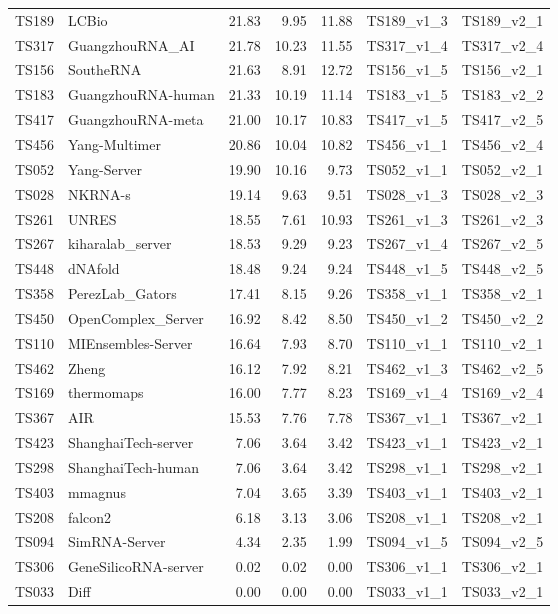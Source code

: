 \begin{table}[ht]
{\begin{tabular}{llrrrll}
TS189 & LCBio & 21.83 & 9.95 & 11.88 & TS189\_v1\_3 & TS189\_v2\_1 \\ 
TS317 & GuangzhouRNA\_AI & 21.78 & 10.23 & 11.55 & TS317\_v1\_4 & TS317\_v2\_4 \\ 
TS156 & SoutheRNA & 21.63 & 8.91 & 12.72 & TS156\_v1\_5 & TS156\_v2\_1 \\ 
TS183 & GuangzhouRNA-human & 21.33 & 10.19 & 11.14 & TS183\_v1\_5 & TS183\_v2\_2 \\ 
TS417 & GuangzhouRNA-meta & 21.00 & 10.17 & 10.83 & TS417\_v1\_5 & TS417\_v2\_5 \\ 
TS456 & Yang-Multimer & 20.86 & 10.04 & 10.82 & TS456\_v1\_1 & TS456\_v2\_4 \\ 
TS052 & Yang-Server & 19.90 & 10.16 & 9.73 & TS052\_v1\_1 & TS052\_v2\_1 \\ 
TS028 & NKRNA-s & 19.14 & 9.63 & 9.51 & TS028\_v1\_3 & TS028\_v2\_3 \\ 
TS261 & UNRES & 18.55 & 7.61 & 10.93 & TS261\_v1\_3 & TS261\_v2\_3 \\ 
TS267 & kiharalab\_server & 18.53 & 9.29 & 9.23 & TS267\_v1\_4 & TS267\_v2\_5 \\ 
TS448 & dNAfold & 18.48 & 9.24 & 9.24 & TS448\_v1\_5 & TS448\_v2\_5 \\ 
TS358 & PerezLab\_Gators & 17.41 & 8.15 & 9.26 & TS358\_v1\_1 & TS358\_v2\_1 \\ 
TS450 & OpenComplex\_Server & 16.92 & 8.42 & 8.50 & TS450\_v1\_2 & TS450\_v2\_2 \\ 
TS110 & MIEnsembles-Server & 16.64 & 7.93 & 8.70 & TS110\_v1\_1 & TS110\_v2\_1 \\ 
TS462 & Zheng & 16.12 & 7.92 & 8.21 & TS462\_v1\_3 & TS462\_v2\_5 \\ 
TS169 & thermomaps & 16.00 & 7.77 & 8.23 & TS169\_v1\_4 & TS169\_v2\_4 \\ 
TS367 & AIR & 15.53 & 7.76 & 7.78 & TS367\_v1\_1 & TS367\_v2\_1 \\ 
TS423 & ShanghaiTech-server & 7.06 & 3.64 & 3.42 & TS423\_v1\_1 & TS423\_v2\_1 \\ 
TS298 & ShanghaiTech-human & 7.06 & 3.64 & 3.42 & TS298\_v1\_1 & TS298\_v2\_1 \\ 
TS403 & mmagnus & 7.04 & 3.65 & 3.39 & TS403\_v1\_1 & TS403\_v2\_1 \\ 
TS208 & falcon2 & 6.18 & 3.13 & 3.06 & TS208\_v1\_1 & TS208\_v2\_1 \\ 
TS094 & SimRNA-Server & 4.34 & 2.35 & 1.99 & TS094\_v1\_5 & TS094\_v2\_5 \\ 
TS306 & GeneSilicoRNA-server & 0.02 & 0.02 & 0.00 & TS306\_v1\_1 & TS306\_v2\_1 \\ 
TS033 & Diff & 0.00 & 0.00 & 0.00 & TS033\_v1\_1 & TS033\_v2\_1 \\ 
\bottomrule
\end{tabular}%
}
\end{table}
